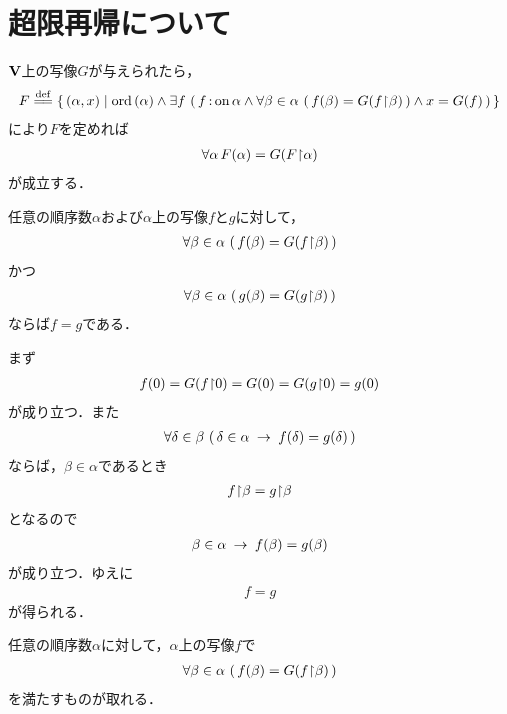 \section{超限再帰について}
	$\mathbf{V}$上の写像$G$が与えられたら，
	\begin{align}
		F \defeq \Set{(\alpha,x)}{\ord{\alpha} \wedge
		\exists f\, \left(\, f \fon \alpha \wedge
		\forall \beta \in \alpha\, \left(\, f(\beta) = G(\rest{f}{\beta})\, \right)
		\wedge x = G(f)\, \right)}
	\end{align}
	により$F$を定めれば
	\begin{align}
		\forall \alpha\, F(\alpha) = G(F\hspace{-0.25em}\upharpoonright\hspace{-0.25em}{\alpha})
	\end{align}
	が成立する．
	
	\begin{screen}
		任意の順序数$\alpha$および$\alpha$上の写像$f$と$g$に対して，
		\begin{align}
			\forall \beta \in \alpha\,
			\left(\, f(\beta) = G(f\hspace{-0.25em}\upharpoonright\hspace{-0.25em}{\beta})\, \right)
		\end{align}
		かつ
		\begin{align}
			\forall \beta \in \alpha\,
			\left(\, g(\beta) = G(g\hspace{-0.25em}\upharpoonright\hspace{-0.25em}{\beta})\, \right)
		\end{align}
		ならば$f = g$である．
	\end{screen}
	
	まず
	\begin{align}
		f(0) = G(f\hspace{-0.25em}\upharpoonright\hspace{-0.25em}{0}) = G(0) = G(g\hspace{-0.25em}\upharpoonright\hspace{-0.25em}{0}) = g(0)
	\end{align}
	が成り立つ．また
	\begin{align}
		\forall \delta \in \beta\, \left(\, 
		\delta \in \alpha \hspace{0.25em}\rightarrow\hspace{0.25em} f(\delta) = g(\delta)\, \right)
	\end{align}
	ならば，$\beta \in \alpha$であるとき
	\begin{align}
		f\hspace{-0.25em}\upharpoonright\hspace{-0.25em}{\beta} = g\hspace{-0.25em}\upharpoonright\hspace{-0.25em}{\beta}
	\end{align}
	となるので
	\begin{align}
		\beta \in \alpha \hspace{0.25em}\rightarrow\hspace{0.25em} f(\beta) = g(\beta)
	\end{align}
	が成り立つ．ゆえに
	\begin{align}
		f = g
	\end{align}
	が得られる．
	
	\begin{screen}
		任意の順序数$\alpha$に対して，$\alpha$上の写像$f$で
		\begin{align}
			\forall \beta \in \alpha\, \left(\, 
			f(\beta) = G(f\hspace{-0.25em}\upharpoonright\hspace{-0.25em}{\beta})\, \right)
		\end{align}
		を満たすものが取れる．
	\end{screen}
	
